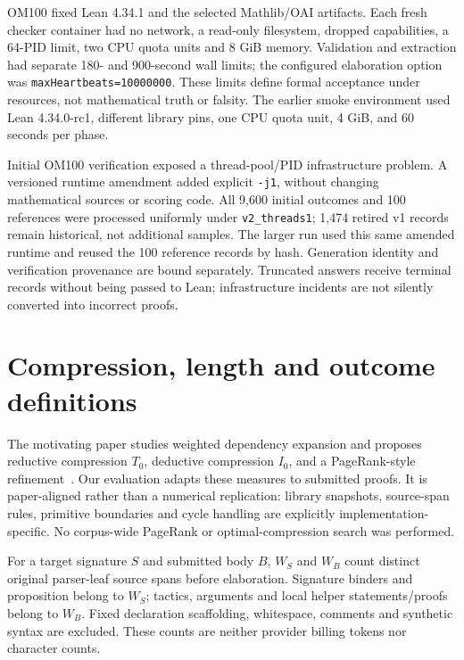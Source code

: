 OM100 fixed Lean 4.34.1 and the selected Mathlib/OAI artifacts. Each fresh checker container had no network, a read-only filesystem, dropped capabilities, a 64-PID limit, two CPU quota units and 8 GiB memory. Validation and extraction had separate 180- and 900-second wall limits; the configured elaboration option was \texttt{maxHeartbeats=10000000}. These limits define formal acceptance under resources, not mathematical truth or falsity. The earlier smoke environment used Lean 4.34.0-rc1, different library pins, one CPU quota unit, 4 GiB, and 60 seconds per phase.

Initial OM100 verification exposed a thread-pool/PID infrastructure problem. A versioned runtime amendment added explicit \texttt{-j1}, without changing mathematical sources or scoring code. All 9,600 initial outcomes and 100 references were processed uniformly under \texttt{v2\_threads1}; 1,474 retired v1 records remain historical, not additional samples. The larger run used this same amended runtime and reused the 100 reference records by hash. Generation identity and verification provenance are bound separately. Truncated answers receive terminal records without being passed to Lean; infrastructure incidents are not silently converted into incorrect proofs.

\section{Compression, length and outcome definitions}
\label{sec:methods-measures}

The motivating paper studies weighted dependency expansion and proposes reductive compression $T_0$, deductive compression $I_0$, and a PageRank-style refinement~\cite{compression}. Our evaluation adapts these measures to submitted proofs. It is paper-aligned rather than a numerical replication: library snapshots, source-span rules, primitive boundaries and cycle handling are explicitly implementation-specific. No corpus-wide PageRank or optimal-compression search was performed.

For a target signature $S$ and submitted body $B$, $W_S$ and $W_B$ count distinct original parser-leaf source spans before elaboration. Signature binders and proposition belong to $W_S$; tactics, arguments and local helper statements/proofs belong to $W_B$. Fixed declaration scaffolding, whitespace, comments and synthetic syntax are excluded. These counts are neither provider billing tokens nor character counts.

